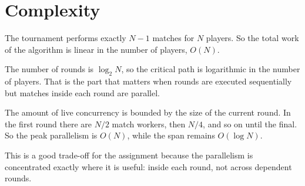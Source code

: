 \section{Complexity}

The tournament performs exactly $N - 1$ matches for $N$ players.
So the total work of the algorithm is linear in the number of players, $O(N)$.

The number of rounds is $\log_2 N$, so the critical path is logarithmic in the number of players.
That is the part that matters when rounds are executed sequentially but matches inside each round are parallel.

The amount of live concurrency is bounded by the size of the current round.
In the first round there are $N/2$ match workers, then $N/4$, and so on until the final.
So the peak parallelism is $O(N)$, while the span remains $O(\log N)$.

This is a good trade-off for the assignment because the parallelism is concentrated exactly where it is useful: inside each
round, not across dependent rounds.
